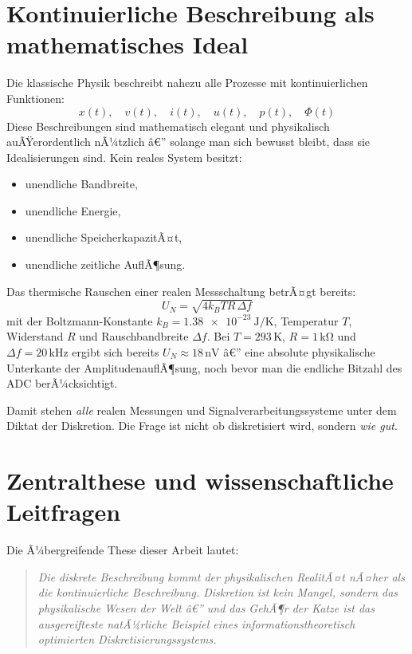 ﻿\documentclass[12pt,a4paper,titlepage]{report}
\begin{document}
\section{Kontinuierliche Beschreibung als mathematisches Ideal}

Die klassische Physik beschreibt nahezu alle Prozesse mit kontinuierlichen
Funktionen:
\[
	x(t), \quad v(t), \quad i(t), \quad u(t), \quad p(t), \quad \Phi(t)
\]
Diese Beschreibungen sind mathematisch elegant und physikalisch auÃŸerordentlich
nÃ¼tzlich â€” solange man sich bewusst bleibt, dass sie Idealisierungen sind.
Kein reales System besitzt:

\begin{itemize}[leftmargin=2em]
	\item unendliche Bandbreite,
	\item unendliche Energie,
	\item unendliche SpeicherkapazitÃ¤t,
	\item unendliche zeitliche AuflÃ¶sung.
\end{itemize}

Das thermische Rauschen einer realen Messschaltung betrÃ¤gt bereits:
\[
	U_N = \sqrt{4 k_B T R \,\Delta f}
\]
mit der Boltzmann-Konstante
$k_B = \SI{1.38e-23}{\joule\per\kelvin}$,
Temperatur $T$, Widerstand $R$ und Rauschbandbreite $\Delta f$.
Bei $T=293\,\mathrm{K}$, $R=1\,\mathrm{k\Omega}$ und $\Delta f=20\,\mathrm{kHz}$
ergibt sich bereits $U_N \approx 18\,\mathrm{nV}$ â€”
eine absolute physikalische Unterkante der AmplitudenauflÃ¶sung,
noch bevor man die endliche Bitzahl des ADC berÃ¼cksichtigt.

Damit stehen \emph{alle} realen Messungen und Signalverarbeitungssysteme
unter dem Diktat der Diskretion.
Die Frage ist nicht ob diskretisiert wird, sondern \emph{wie gut}.

\section{Zentralthese und wissenschaftliche Leitfragen}

Die Ã¼bergreifende These dieser Arbeit lautet:

\begin{quote}
	\itshape
	Die diskrete Beschreibung kommt der physikalischen RealitÃ¤t nÃ¤her
	als die kontinuierliche Beschreibung.
	Diskretion ist kein Mangel, sondern das physikalische Wesen der Welt â€”
	und das GehÃ¶r der Katze ist das ausgereifteste natÃ¼rliche Beispiel
	eines informationstheoretisch optimierten Diskretisierungssystems.
\end{quote}
\end{document}
